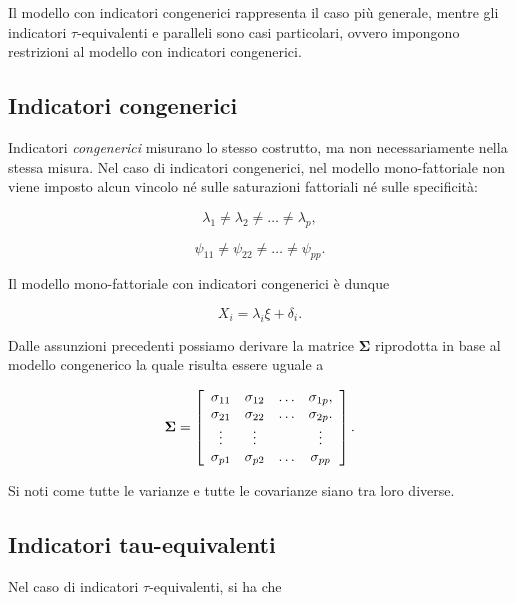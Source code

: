 \documentclass[
  11pt,
]{krantz}
\theoremstyle{definition}
\theoremstyle{definition}
\theoremstyle{definition}
\theoremstyle{definition}
\theoremstyle{remark}
\begin{document}
Il modello con indicatori congenerici rappresenta il caso più generale, mentre gli indicatori \(\tau\)-equivalenti e paralleli sono casi particolari, ovvero impongono restrizioni al modello con indicatori congenerici.

\hypertarget{indicatori-congenerici}{%
\subsection{Indicatori congenerici}\label{indicatori-congenerici}}

Indicatori \emph{congenerici} misurano lo stesso costrutto, ma non necessariamente nella stessa misura. Nel caso di indicatori congenerici, nel modello mono-fattoriale non viene imposto alcun vincolo né sulle saturazioni fattoriali né sulle specificità:

\[
\lambda_1\neq \lambda_2 \neq \dots\neq \lambda_p,
\]

\[
\psi_{11}\neq \psi_{22} \neq \dots\neq \psi_{pp}.
\]

Il modello mono-fattoriale con indicatori congenerici è dunque

\begin{equation}
X_i = \lambda_i \xi + \delta_i.
\label{eq:mod-tau-eq}
\end{equation}

Dalle assunzioni precedenti possiamo derivare la matrice \(\boldsymbol{\Sigma}\) riprodotta in base al modello congenerico la quale risulta essere uguale a

\[
\boldsymbol{\Sigma}=\left[
      \begin{array}{ c c c c }
        \sigma_{11} & \sigma_{12} & \dots & \sigma_{1p}, \\
        \sigma_{21} & \sigma_{22} & \dots & \sigma_{2p}. \\
        \vdots & \vdots & & \vdots\\
        \sigma_{p1} & \sigma_{p2} & \dots & \sigma_{pp} 
      \end{array} 
    \right].
\]

Si noti come tutte le varianze e tutte le covarianze siano tra loro diverse.

\hypertarget{indicatori-tau-equivalenti}{%
\subsection{Indicatori tau-equivalenti}\label{indicatori-tau-equivalenti}}

Nel caso di indicatori \(\tau\)-equivalenti, si ha che
\end{document}
